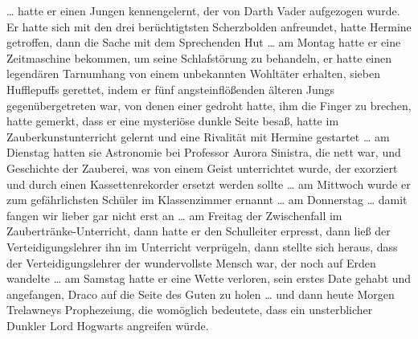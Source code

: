 … hatte er einen Jungen kennengelernt, der von Darth Vader aufgezogen wurde. Er hatte sich mit den drei berüchtigtsten Scherzbolden anfreundet, hatte Hermine getroffen, dann die Sache mit dem Sprechenden Hut … am Montag hatte er eine Zeitmaschine bekommen, um seine Schlafstörung zu behandeln, er hatte einen legendären Tarnumhang von einem unbekannten Wohltäter erhalten, sieben Hufflepuffs gerettet, indem er fünf angsteinflößenden älteren Jungs gegenübergetreten war, von denen einer gedroht hatte, ihm die Finger zu brechen, hatte gemerkt, dass er eine mysteriöse dunkle Seite besaß, hatte im Zauberkunstunterricht  gelernt und eine Rivalität mit Hermine gestartet … am Dienstag hatten sie Astronomie bei Professor Aurora Sinistra, die nett war, und Geschichte der Zauberei, was von einem Geist unterrichtet wurde, der exorziert und durch einen Kassettenrekorder ersetzt werden sollte … am Mittwoch wurde er zum gefährlichsten Schüler im Klassenzimmer ernannt … am Donnerstag … damit fangen wir lieber gar nicht erst an … am Freitag der Zwischenfall im Zaubertränke-Unterricht, dann hatte er den Schulleiter erpresst, dann ließ der Verteidigungslehrer ihn im Unterricht verprügeln, dann stellte sich heraus, dass der Verteidigungslehrer der wundervollste Mensch war, der noch auf Erden wandelte … am Samstag hatte er eine Wette verloren, sein erstes Date gehabt und angefangen, Draco auf die Seite des Guten zu holen … und dann heute Morgen Trelawneys Prophezeiung, die womöglich bedeutete, dass ein unsterblicher Dunkler Lord Hogwarts angreifen würde.

